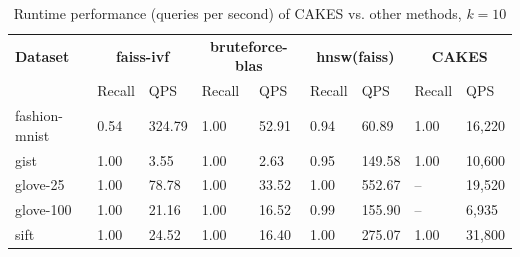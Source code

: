 \begin{table}[!t]
    \caption{Runtime performance (queries per second) of CAKES vs. other methods, $k=10$}
    \label{table:results:ann-10}
    \vskip 0.15in
    \begin{center}
    \begin{small}
    \begin{sc}
    \begin{tabular}{|l|p{1cm}|p{1cm}|p{1cm}|p{1cm}|p{1cm}|p{1cm}|p{1cm}|p{1cm}|}
    \textbf{Dataset}  & \multicolumn{2}{|c|}{\textbf{faiss-ivf}} & \multicolumn{2}{|c|}{\textbf{bruteforce-blas}} & \multicolumn{2}{|c|}{\textbf{hnsw(faiss)}} & \multicolumn{2}{|c|}{\textbf{CAKES}} \\
    \cline{2-9}
    &                    Recall & QPS                           & Recall & QPS                           & Recall & QPS                                           & Recall & QPS \\
    \hline
    fashion-mnist      & 0.54 & 324.79                           & 1.00 & 52.91                                  & 0.94 & 60.89                                                    & 1.00 & 16,220 \\
    \hline
    gist                   & 1.00 & 3.55                           & 1.00 & 2.63                                     & 0.95 & 149.58                                                   & 1.00 & 10,600 \\
    \hline
    glove-25              & 1.00 & 78.78                          & 1.00 & 33.52                              & 1.00 & 552.67                                                  & -- & 19,520 \\
    \hline
    glove-100             & 1.00 & 21.16                          & 1.00 & 16.52                                & 0.99 & 155.90                                                  & -- & 6,935 \\
    \hline
    sift                  & 1.00 &  24.52                          & 1.00 & 16.40                               & 1.00 & 275.07                                                    & 1.00 & 31,800 \\
    \hline
    \end{tabular}
    \end{sc}
    \end{small}
    \end{center}
    \vskip -0.1in
    \end{table}


